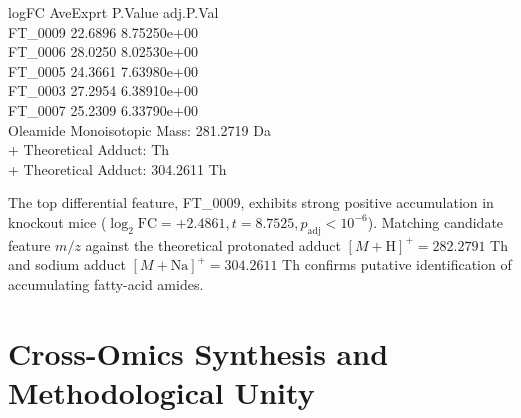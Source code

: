 \documentclass[11pt,twoside,openright]{book}
\begin{document}
\begin{routput}
\enspace\enspace\enspace\enspace\enspace\enspace\enspace\enspace logFC AveExpr\enspace\enspace\enspace\enspace\enspace t P.Value adj.P.Val\\
FT\_0009 22.6896 8.7525\enspace\enspace\enspace\enspace{}\enspace\enspace\enspace\enspace\enspace 0e+00\\
FT\_0006 28.0250 8.0253\enspace\enspace\enspace\enspace{}\enspace\enspace\enspace\enspace\enspace 0e+00\\
FT\_0005 24.3661 7.6398\enspace\enspace\enspace\enspace{}\enspace\enspace\enspace\enspace\enspace 0e+00\\
FT\_0003 27.2954 6.3891\enspace\enspace\enspace\enspace{}\enspace\enspace\enspace\enspace\enspace 0e+00\\
FT\_0007 25.2309 6.3379\enspace\enspace\enspace\enspace{}\enspace\enspace\enspace\enspace\enspace 0e+00\\[0.4em]
Oleamide Monoisotopic Mass: 281.2719 Da\\
\enspace\enspace [M+H]+ Theoretical Adduct: Th\\
\enspace\enspace [M+Na]+ Theoretical Adduct: 304.2611 Th
\end{routput}

The top differential feature, FT\_0009, exhibits strong positive accumulation in knockout mice ($\log_2\text{FC} = +2.4861, t = 8.7525, p_{\text{adj}} < 10^{-6}$). Matching candidate feature $m/z$ against the theoretical protonated adduct $[M+\text{H}]^+ = 282.2791$ Th and sodium adduct $[M+\text{Na}]^+ = 304.2611$ Th confirms putative identification of accumulating fatty-acid amides.

\FloatBarrier
\section{Cross-Omics Synthesis and Methodological Unity}
\label{sec:cross_omics_synthesis}
\end{document}
